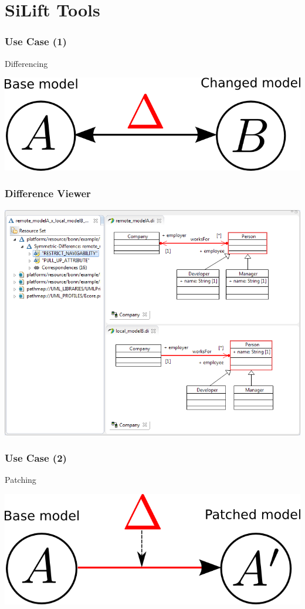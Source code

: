 \section{SiLift Tools}
\begin{frame}
\frametitle{Use Case (1)}
\begin{block}{Differencing}
  \begin{center}
\includegraphics[scale=0.5]{images/createPatch}
  \end{center}
\end{block}
\end{frame}
\begin{frame}
  \frametitle{Difference Viewer}
  \begin{center}
  \includegraphics[scale=0.5]{images/symmetric_collapsed}
  \end{center}
\end{frame}
\begin{frame}
\frametitle{Use Case (2)}
\begin{block}{Patching}
  \begin{center}
\includegraphics[scale=0.5]{images/applyPatch}
  \end{center}
\end{block}
\end{frame}
